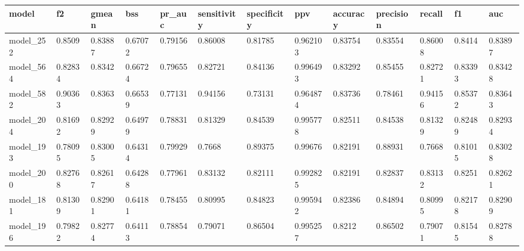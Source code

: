 \begin{tabular}{|l|l|l|l|l|l|l|l|l|l|l|l|l|}
\hline
\textbf{model} & \textbf{f2} & \textbf{gmean} & \textbf{bss} & \textbf{pr\_auc} & \textbf{sensitivity} & \textbf{specificity} & \textbf{ppv} & \textbf{accuracy} & \textbf{precision} & \textbf{recall} & \textbf{f1} & \textbf{auc} \\ \hline
model\_252     & 0.8509      & 0.83887        & 0.67072      & 0.79156          & 0.86008              & 0.81785              & 0.962103     & 0.83754           & 0.83554            & 0.86008         & 0.8414      & 0.83897      \\ \hline
model\_564     & 0.82834     & 0.8342         & 0.66724      & 0.79655          & 0.82721              & 0.84136              & 0.996493     & 0.83292           & 0.85455            & 0.82721         & 0.83393     & 0.83428      \\ \hline
model\_582     & 0.90363     & 0.8363         & 0.66539      & 0.77131          & 0.94156              & 0.73131              & 0.964874     & 0.83736           & 0.78461            & 0.94156         & 0.85372     & 0.83643      \\ \hline
model\_204     & 0.81692     & 0.82929        & 0.64979      & 0.78831          & 0.81329              & 0.84539              & 0.995778     & 0.82511           & 0.84538            & 0.81329         & 0.82489     & 0.82934      \\ \hline
model\_193     & 0.78095     & 0.83005        & 0.64314      & 0.79929          & 0.7668               & 0.89375              & 0.99676      & 0.82191           & 0.88931            & 0.7668          & 0.81015     & 0.83028      \\ \hline
model\_200     & 0.82768     & 0.82617        & 0.64288      & 0.77961          & 0.83132              & 0.82111              & 0.992825     & 0.82191           & 0.82837            & 0.83132         & 0.8251      & 0.82621      \\ \hline
model\_181     & 0.81309     & 0.82901        & 0.64181      & 0.78455          & 0.80995              & 0.84823              & 0.995942     & 0.82386           & 0.84894            & 0.80995         & 0.82178     & 0.82909      \\ \hline
model\_196     & 0.79822     & 0.82774        & 0.64113      & 0.78854          & 0.79071              & 0.86504              & 0.995257     & 0.8212            & 0.86502            & 0.79071         & 0.81545     & 0.82788      \\ \hline

\end{tabular}
